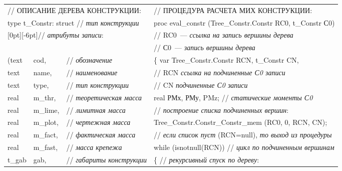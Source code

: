 \begin{multicols}{2}
\begin{figure*} %
\begin{center}
\tabcolsep=1.75pt
{\small\begin{tabular}{llll}
\multicolumn{3}{l}{// ОПИСАНИЕ ДЕРЕВА КОНСТРУКЦИИ:}&                      // ПРОЦЕДУРА РАСЧЕТА МИХ КОНСТРУКЦИИ:\\[6pt]                             
 \multicolumn{3}{l}{type t\_Constr: struct // \textit{тип конструкции}}&  proc eval\_constr (Tree\_Constr.Constr RC0, t\_Constr С0) \\             
\multicolumn{3}{l}{{\raisebox{-6pt}[0pt][-6pt]{\hspace*{10mm}// \textit{атрибуты записи}:}}}&           // RC0~--- \textit{ссылка на запись вершины дерева} \\                   
\multicolumn{3}{l}{\ } &// С0~--- \textit{запись вершины дерева}\\                               
(text &cod, &// \textit{обозначение}&                                     \{ var Tree\_Constr.Constr RCN, t\_Constr CN,\\                          
text &name, &// \textit{наименование}&                                    // RCN \textit{ссылка на подчиненные С0 записи}\\                        
text &type, &// \textit{тип конструкции }&                                // CN \textit{подчиненные С0 записи}\\                                   
real &m\_thr, &// \textit{теоретическая масса }&                          real РМх, РМу, PMz; // \textit{статические моменты С0}\\                 
real &m\_lime,& // \textit{лимитная масса }&                              // \textit{построение списка подчиненных вершин}:\\                      
real &m\_plot, &// \textit{чертежная масса }&                             Tree\_Constr.Constr\_Constr\_mem (RC0, 0, RCN, CN);\\                    
real &m\_fact, &// \textit{фактическая масса}&                            // \textit{если список пуст} (RCN=null), \textit{то выход из процедуры}\\
real &m\_fast, &// \textit{масса крепежа}&                                {while} (isnotnull(RCN)) // \textit{цикл по подчиненным вершинам}\\      
t\_gab &gab, &// \textit{габариты конструкции }&                          \{  // \textit{рекурсивный спуск по дереву}: \\                          

\end{tabular}}
\end{center}
\end{figure*}
\end{multicols}
